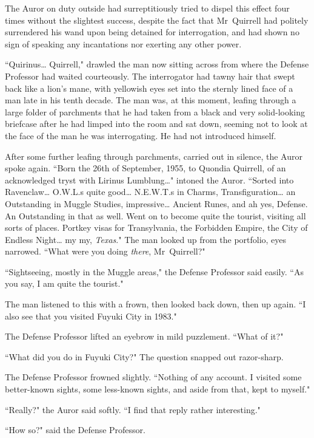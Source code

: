 The Auror on duty outside had surreptitiously tried to dispel this effect four times without the slightest success, despite the fact that Mr~Quirrell had politely surrendered his wand upon being detained for interrogation, and had shown no sign of speaking any incantations nor exerting any other power.

``Quirinus{\ldots} Quirrell," drawled the man now sitting across from where the Defense Professor had waited courteously. The interrogator had tawny hair that swept back like a lion's mane, with yellowish eyes set into the sternly lined face of a man late in his tenth decade. The man was, at this moment, leafing through a large folder of parchments that he had taken from a black and very solid-looking briefcase after he had limped into the room and sat down, seeming not to look at the face of the man he was interrogating. He had not introduced himself.

After some further leafing through parchments, carried out in silence, the Auror spoke again. ``Born the 26th of September, 1955, to Quondia Quirrell, of an acknowledged tryst with Lirinus Lumblung{\ldots}" intoned the Auror. ``Sorted into Ravenclaw{\ldots} O.W.L.s quite good{\ldots} N.E.W.T.s in Charms, Transfiguration{\ldots} an Outstanding in Muggle Studies, impressive{\ldots} Ancient Runes, and ah yes, Defense. An Outstanding in that as well. Went on to become quite the tourist, visiting all sorts of places. Portkey visas for Transylvania, the Forbidden Empire, the City of Endless Night{\ldots} my my, \emph{Texas}." The man looked up from the portfolio, eyes narrowed. ``What were you doing \emph{there}, Mr~Quirrell?"

``Sightseeing, mostly in the Muggle areas," the Defense Professor said easily. ``As you say, I am quite the tourist."

The man listened to this with a frown, then looked back down, then up again. ``I also see that you visited Fuyuki City in 1983."

The Defense Professor lifted an eyebrow in mild puzzlement. ``What of it?"

``What did you do in Fuyuki City?" The question snapped out razor-sharp.

The Defense Professor frowned slightly. ``Nothing of any account. I visited some better-known sights, some less-known sights, and aside from that, kept to myself."

``Really?" the Auror said softly. ``I find that reply rather interesting."

``How so?" said the Defense Professor.

